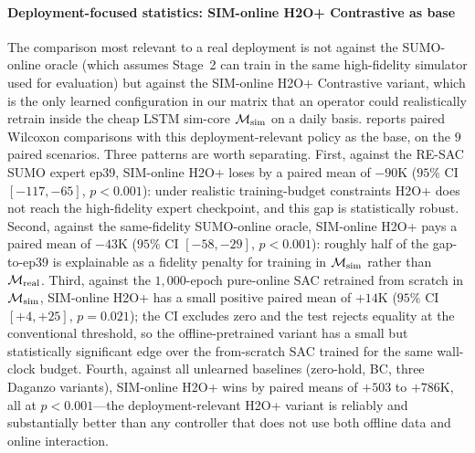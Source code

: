 \paragraph{Deployment-focused statistics: SIM-online H2O+ Contrastive as base}
The comparison most relevant to a real deployment is not against the SUMO-online oracle (which assumes Stage~2 can train in the same high-fidelity simulator used for evaluation) but against the SIM-online H2O+ Contrastive variant, which is the only learned configuration in our matrix that an operator could realistically retrain inside the cheap LSTM sim-core $\mathcal{M}_{\mathrm{sim}}$ on a daily basis.
 reports paired Wilcoxon comparisons with this deployment-relevant policy as the base, on the $9$ paired scenarios.
Three patterns are worth separating.
First, against the RE-SAC SUMO expert ep39, SIM-online H2O+ loses by a paired mean of $-90$K ($95\%$ CI $[-117, -65]$, $p < 0.001$): under realistic training-budget constraints H2O+ does not reach the high-fidelity expert checkpoint, and this gap is statistically robust.
Second, against the same-fidelity SUMO-online oracle, SIM-online H2O+ pays a paired mean of $-43$K ($95\%$ CI $[-58, -29]$, $p < 0.001$): roughly half of the gap-to-ep39 is explainable as a fidelity penalty for training in $\mathcal{M}_{\mathrm{sim}}$ rather than $\mathcal{M}_{\mathrm{real}}$.
Third, against the $1{,}000$-epoch pure-online SAC retrained from scratch in $\mathcal{M}_{\mathrm{sim}}$, SIM-online H2O+ has a small positive paired mean of $+14$K ($95\%$ CI $[+4, +25]$, $p = 0.021$); the CI excludes zero and the test rejects equality at the conventional threshold, so the offline-pretrained variant has a small but statistically significant edge over the from-scratch SAC trained for the same wall-clock budget.
Fourth, against all unlearned baselines (zero-hold, BC, three Daganzo variants), SIM-online H2O+ wins by paired means of $+503$ to $+786$K, all at $p < 0.001$---the deployment-relevant H2O+ variant is reliably and substantially better than any controller that does not use both offline data and online interaction.

